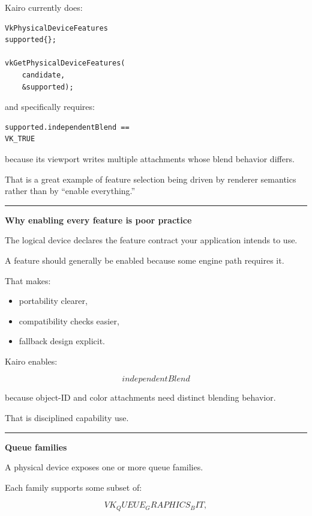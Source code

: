 Kairo currently does:

\begin{verbatim}
VkPhysicalDeviceFeatures
supported{};

vkGetPhysicalDeviceFeatures(
    candidate,
    &supported);
\end{verbatim}

and specifically requires:

\begin{verbatim}
supported.independentBlend ==
VK_TRUE
\end{verbatim}

because its viewport writes multiple attachments whose blend behavior differs.

That is a great example of feature selection being driven by renderer semantics rather than by ``enable everything.''

\begin{center}\rule{0.5\linewidth}{0.5pt}\end{center}

\textbf{Why enabling every feature is poor practice}

The logical device declares the feature contract your application intends to use.

A feature should generally be enabled because some engine path requires it.

That makes:

\begin{itemize}
\tightlist
\item
  portability clearer,
\item
  compatibility checks easier,
\item
  fallback design explicit.
\end{itemize}

Kairo enables:

\[
\boxed{
independentBlend
}
\]

because object-ID and color attachments need distinct blending behavior.

That is disciplined capability use.

\begin{center}\rule{0.5\linewidth}{0.5pt}\end{center}

\textbf{Queue families}

A physical device exposes one or more queue families.

Each family supports some subset of:

\[
VK_QUEUE_GRAPHICS_BIT,
\]

